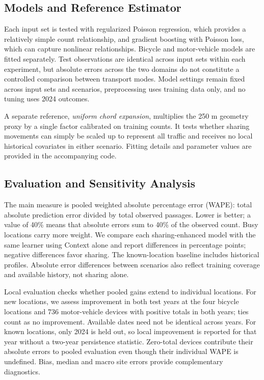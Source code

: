 \documentclass[]{interact}
\begin{document}
\subsection{Models and Reference Estimator}
Each input set is tested with regularized Poisson regression, which provides a relatively simple count relationship, and gradient boosting with Poisson loss, which can capture nonlinear relationships. Bicycle and motor-vehicle models are fitted separately. Test observations are identical across input sets within each experiment, but absolute errors across the two domains do not constitute a controlled comparison between transport modes. Model settings remain fixed across input sets and scenarios, preprocessing uses training data only, and no tuning uses 2024 outcomes.

A separate reference, \emph{uniform chord expansion}, multiplies the 250 m geometry proxy by a single factor calibrated on training counts. It tests whether sharing movements can simply be scaled up to represent all traffic and receives no local historical covariates in either scenario. Fitting details and parameter values are provided in the accompanying code.

\subsection{Evaluation and Sensitivity Analysis}
The main measure is pooled weighted absolute percentage error (WAPE): total absolute prediction error divided by total observed passages. Lower is better; a value of 40\% means that absolute errors sum to 40\% of the observed count. Busy locations carry more weight. We compare each sharing-enhanced model with the same learner using Context alone and report differences in percentage points; negative differences favor sharing. The known-location baseline includes historical profiles. Absolute error differences between scenarios also reflect training coverage and available history, not sharing alone.

Local evaluation checks whether pooled gains extend to individual locations. For new locations, we assess improvement in both test years at the four bicycle locations and 736 motor-vehicle devices with positive totals in both years; ties count as no improvement. Available dates need not be identical across years. For known locations, only 2024 is held out, so local improvement is reported for that year without a two-year persistence statistic. Zero-total devices contribute their absolute errors to pooled evaluation even though their individual WAPE is undefined. Bias, median and macro site errors provide complementary diagnostics.
\end{document}
